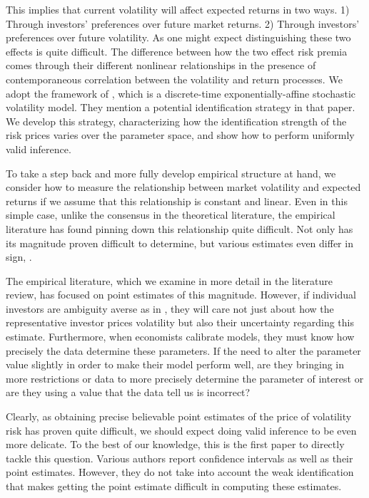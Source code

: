 \documentclass[11pt, letterpaper, twoside, final]{article}
\begin{document}
This implies that current volatility will affect expected returns in two ways. 1) Through investors' preferences
over future market returns. 2) Through investors' preferences over future volatility. 
As one might expect distinguishing these two effects is quite difficult. 
The difference between how the two effect risk premia comes through their different nonlinear relationships in the
presence of contemporaneous correlation between the volatility and return processes. 
We adopt the framework of \textcite{khrapov2016affine}, which is a discrete-time exponentially-affine stochastic
volatility model.
They mention a potential identification strategy in that paper. 
We develop this strategy,  characterizing how the identification strength of the risk prices varies over the
parameter space, and show how to perform uniformly valid inference.

To take a step back and more fully develop empirical structure at hand, we consider how to measure the
relationship between market volatility and expected returns if we assume that this relationship is constant and
linear. 
Even in this simple case, unlike the consensus in the theoretical literature, the empirical literature has found
pinning down this relationship quite difficult.
Not only has its magnitude proven difficult to determine, but various estimates even differ in sign,
\parencite{lettau2010measuring}.

The empirical literature, which we examine in more detail in the literature review, has focused on point estimates
of this magnitude. 
However, if individual investors are ambiguity averse as in \textcite{hansen2001robust, jiu2012ambiguity}, they
will care not just about how the representative investor prices volatility but also their uncertainty regarding
this estimate. 
Furthermore, when economists calibrate models, they must know how precisely the data determine these parameters. 
If the need to alter the parameter value slightly in order to make their model perform well, are they bringing in
more restrictions or data to more precisely determine the parameter of interest or are they using a value that the
data tell us is incorrect?

Clearly, as obtaining precise believable point estimates of the price of volatility risk has proven quite
difficult, we should expect doing valid inference to be even more delicate.
To the best of our knowledge, this is the first paper to directly tackle this question.
Various authors report confidence intervals as well as their point estimates.
However, they do not take into account the weak identification that makes getting the point estimate difficult in
computing these estimates.
\end{document}
